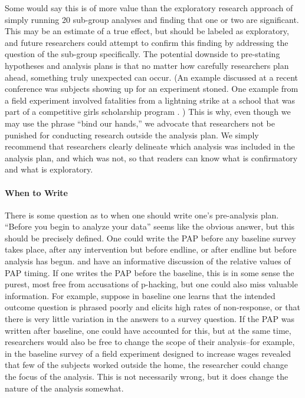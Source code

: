 \documentclass[12pt] {article}
\begin{document}
Some would say this is of more value than the exploratory research approach of simply running 20 sub-group analyses and finding that one or two are significant. This may be an estimate of a true effect, but should be labeled as exploratory, and future researchers could attempt to confirm this finding by addressing the question of the sub-group specifically. The potential downside to pre-stating hypotheses and analysis plans is that no matter how carefully researchers plan ahead, something truly unexpected can occur. (An example discussed at a recent conference was subjects showing up for an experiment stoned. One example from a field experiment involved fatalities from a lightning strike at a school that was part of a competitive girls scholarship program \citep{kremer2009incentives}. ) This is why, even though we may use the phrase ``bind our hands,'' we advocate that researchers not be punished for conducting research outside the analysis plan. We simply recommend that researchers clearly delineate which analysis was included in the analysis plan, and which was not, so that readers can know what is confirmatory and what is exploratory.


\paragraph{When to Write}
There is some question as to when one should write one's pre-analysis plan. ``Before you begin to analyze your data'' seems like the obvious answer, but this should be precisely defined. One could write the PAP before any baseline survey takes place, after any intervention but before endline, or after endline but before analysis has begun. \cite{glennerster_running_2013} and \cite{OlkenPAP} have an informative discussion of the relative values of PAP timing. If one writes the PAP before the baseline, this is in some sense the purest, most free from accusations of p-hacking, but one could also miss valuable information. For example, suppose in baseline one learns that the intended outcome question is phrased poorly and elicits high rates of non-response, or that there is very little variation in the answers to a survey question. If the PAP was written after baseline, one could have accounted for this, but at the same time, researchers would also be free to change the scope of their analysis--for example, in the baseline survey of a field experiment designed to increase wages revealed that few of the subjects worked outside the home, the researcher could change the focus of the analysis. This is not necessarily wrong, but it does change the nature of the analysis somewhat.
\end{document}
